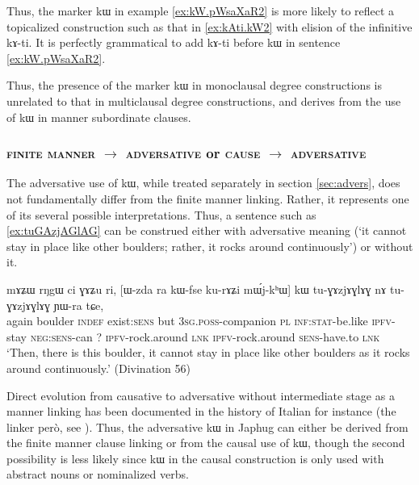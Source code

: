 \documentclass[oldfontcommands,oneside,a4paper,11pt]{article}
\newcommand{\ipa}[1]{{\phon #1}} %
\begin{document}
Thus, the marker \ipa{kɯ} in example \ref{ex:kW.pWsaXaR2}  is more likely to reflect a topicalized construction such as that in \ref{ex:kAti.kW2}  with elision of the infinitive \ipa{kɤ-ti}. It is perfectly grammatical to add \ipa{kɤ-ti} before \ipa{kɯ} in sentence \ref{ex:kW.pWsaXaR2}. 

Thus, the presence of the marker \ipa{kɯ} in monoclausal degree constructions is unrelated to that in multiclausal degree constructions, and derives from the use of \ipa{kɯ} in manner subordinate clauses. 


 \subsubsection{\textsc{finite manner} $\rightarrow$ \textsc{adversative} or \textsc{cause} $\rightarrow$ \textsc{adversative} }
 
The adversative use of \ipa{kɯ}, while treated separately  in section \ref{sec:advers}, does not fundamentally  differ from the finite manner linking. Rather, it represents one of its several possible interpretations. Thus, a sentence such as  \ref{ex:tuGAzjAGlAG} can be construed either with adversative meaning (`it cannot stay in place like other boulders; rather, it rocks around continuously') or without it.
 
 \begin{exe}
\ex \label{ex:tuGAzjAGlAG}
\gll  
    \ipa{mɤʑɯ}  	\ipa{rŋgɯ}  	\ipa{ci}  	\ipa{ɣɤʑu}  	\ipa{ri,}  	[\ipa{ɯ-zda}  	\ipa{ra}  	\ipa{kɯ-fse}  	\ipa{ku-rɤʑi}  	\ipa{mɯ́j-kʰɯ}]  	\ipa{kɯ}  	\ipa{tu-ɣɤzjɤɣlɤɣ}  	\ipa{nɤ}  	\ipa{tu-ɣɤzjɤɣlɤɣ}  	\ipa{ɲɯ-ra}  	\ipa{tɕe,}  \\
    again boulder \textsc{indef} exist:\textsc{sens} but \textsc{3sg.poss}-companion \textsc{pl} \textsc{inf:stat}-be.like \textsc{ipfv}-stay \textsc{neg:sens}-can ?{ } \textsc{ipfv}-rock.around \textsc{lnk} \textsc{ipfv}-rock.around  \textsc{sens}-have.to \textsc{lnk}     \\
   \glt `Then, there is this boulder, it cannot stay in place like other boulders as it rocks around continuously.' (Divination  56)
 \end{exe}
 
Direct evolution from causative to adversative without intermediate stage as a manner linking has been documented in the history of Italian for instance (the linker \ipa{però}, see  \citealt{mauri12adversative}). Thus, 
the adversative \ipa{kɯ} in Japhug can either be derived from the finite manner clause linking or from the causal use of  \ipa{kɯ}, though the second possibility is less likely since \ipa{kɯ} in the causal construction is only used with abstract nouns or nominalized verbs.
 
\end{document}
